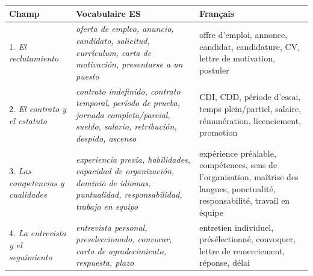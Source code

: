 \documentclass[11pt]{article}
\newcommand{\esp}[1]{\ifmmode\text{\textit{#1}}\else\begingroup\selectlanguage{spanish}\itshape #1\endgroup\fi}
\begin{document}
\begin{center}
\begin{tabularx}{\linewidth}{|X|X|X|}
\hline
\rowcolor{popblueL} \textbf{Champ} & \textbf{Vocabulaire ES} & \textbf{Français} \\
\hline
1. \esp{El reclutamiento} & \esp{oferta de empleo, anuncio, candidato, solicitud, currículum, carta de motivación, presentarse a un puesto} & offre d'emploi, annonce, candidat, candidature, CV, lettre de motivation, postuler \\
\hline
2. \esp{El contrato y el estatuto} & \esp{contrato indefinido, contrato temporal, período de prueba, jornada completa/parcial, sueldo, salario, retribución, despido, ascenso} & CDI, CDD, période d'essai, temps plein/partiel, salaire, rémunération, licenciement, promotion \\
\hline
3. \esp{Las competencias y cualidades} & \esp{experiencia previa, habilidades, capacidad de organización, dominio de idiomas, puntualidad, responsabilidad, trabajo en equipo} & expérience préalable, compétences, sens de l'organisation, maîtrise des langues, ponctualité, responsabilité, travail en équipe \\
\hline
4. \esp{La entrevista y el seguimiento} & \esp{entrevista personal, preseleccionado, convocar, carta de agradecimiento, respuesta, plazo} & entretien individuel, présélectionné, convoquer, lettre de remerciement, réponse, délai \\
\hline
\end{tabularx}
\end{center}
\end{document}
